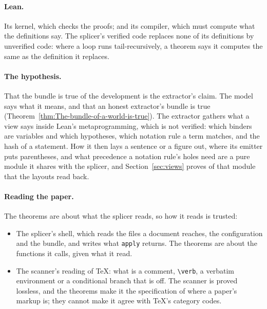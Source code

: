\documentclass[acmsmall,screen,review,anonymous,nonacm]{acmart}
\begin{document}
\paragraph{Lean.} Its kernel, which checks the proofs; and its compiler,
which must compute what the definitions say. The splicer's verified code
replaces none of its definitions by unverified code: where a loop runs
tail-recursively, a theorem says it computes the same as the definition it
replaces.

\paragraph{The hypothesis.} That the bundle is true of the development is
the extractor's claim. The model says what it means, and that an honest
extractor's bundle is true (Theorem~\ref{thm:The-bundle-of-a-world-is-true}).
The extractor gathers what a view says inside Lean's metaprogramming,
which is not verified: which binders are variables and which hypotheses,
which notation rule a term matches, and the hash of a statement. How it
then lays a sentence or a figure out, where its emitter puts parentheses,
and what precedence a notation rule's holes need are a pure module it
shares with the splicer, and Section~\ref{sec:views} proves of that module
that the layouts read back.

\paragraph{Reading the paper.} The theorems are about what the splicer
reads, so how it reads is trusted:
\begin{itemize}
\item The splicer's shell, which reads the files a document reaches, the
  configuration and the bundle, and writes what \verb|apply| returns. The
  theorems are about the functions it calls, given what it read.
\item The scanner's reading of \TeX{}: what is a comment, \verb|\verb|, a
  verbatim environment or a conditional branch that is off. The scanner is
  proved lossless, and the theorems make it the specification of where a
  paper's markup is; they cannot make it agree with \TeX{}'s category codes.
\end{itemize}
\end{document}

